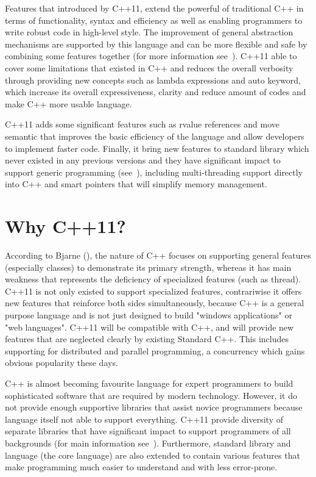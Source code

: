 \documentclass[11pt]{report}
\begin{document}
Features that introduced by C++11, extend the powerful of traditional C++ in terms of functionality, syntax and efficiency as well as enabling programmers to write robust code in high-level style. The improvement of general abstraction mechanisms are supported by this language and can be more flexible and safe by combining some features together (for more information see~\cite{Stroustrup:2012:Cpp11}). C++11 able to cover some limitations that existed in C++ and reduces the overall verbosity through providing new concepts such as lambda expressions and auto keyword, which increase its overall expressiveness, clarity and  reduce amount of codes and make C++ more usable language.

C++11 adds some significant features such as rvalue references and move semantic that improves the basic efficiency of the language and allow developers to implement faster code. Finally, it bring new features to standard library which never existed in any previous versions and they have significant impact to support generic programming (see~\cite{Stroustrup:2012:Cpp11}), including multi-threading support directly into C++ and smart pointers that will simplify memory management.

\section{Why C++11?}
\label{sec: why C++11}
According to Bjarne (\cite{Stroustrup:2005:Cpp}), the nature of C++ focuses on supporting general features (especially classes) to demonstrate its primary strength, whereas it has main weakness that represents the deficiency of specialized features (such as thread). C++11 is not  only existed to support specialized features, contrariwise it offers new features that reinforce both sides simultaneously, because C++ is a general purpose language and is not just designed to build "windows applications" or "web languages". C++11 will be compatible with C++, and will provide new features that are neglected clearly by existing Standard C++. This includes supporting for distributed and parallel programming, a concurrency which gains obvious popularity these days.

C++ is almost becoming favourite language for expert programmers to build sophisticated software that are required by modern technology. However, it do not provide enough supportive libraries that assist novice programmers because language itself not able to support everything. C++11 provide diversity of separate libraries that have significant impact to support programmers of all backgrounds (for main information see~\cite{Stroustrup:2005:Design}). Furthermore, standard library and language (the core language) are also extended to contain various features that make programming much easier to understand and with less error-prone.
\end{document}
